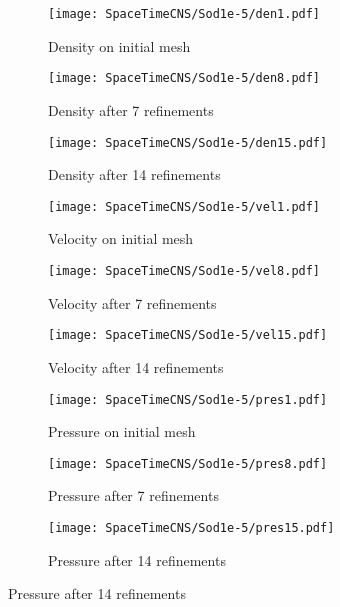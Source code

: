 \documentclass[Proposal.tex]{subfiles}
\begin{document}
\begin{figure}[p]
\centering
\begin{subfigure}[c]{0.3\textwidth}
\centering
\texttt{[image: SpaceTimeCNS/Sod1e-5/den1.pdf]}
\caption{Density on initial mesh}
\label{fig:spaceTimeCNS_den0}
\end{subfigure}
\begin{subfigure}[c]{0.3\textwidth}
\centering
\texttt{[image: SpaceTimeCNS/Sod1e-5/den8.pdf]}
\caption{Density after 7 refinements}
\label{fig:spaceTimeCNS_den7}
\end{subfigure}
\begin{subfigure}[c]{0.3\textwidth}
\centering
\texttt{[image: SpaceTimeCNS/Sod1e-5/den15.pdf]}
\caption{Density after 14 refinements}
\label{fig:spaceTimeCNS_den7}
\end{subfigure}
\begin{subfigure}[c]{0.3\textwidth}
\centering
\texttt{[image: SpaceTimeCNS/Sod1e-5/vel1.pdf]}
\caption{Velocity on initial mesh}
\label{fig:spaceTimeCNS_vel0}
\end{subfigure}
\begin{subfigure}[c]{0.3\textwidth}
\centering
\texttt{[image: SpaceTimeCNS/Sod1e-5/vel8.pdf]}
\caption{Velocity after 7 refinements}
\label{fig:spaceTimeCNS_vel7}
\end{subfigure}
\begin{subfigure}[c]{0.3\textwidth}
\centering
\texttt{[image: SpaceTimeCNS/Sod1e-5/vel15.pdf]}
\caption{Velocity after 14 refinements}
\label{fig:spaceTimeCNS_vel14}
\end{subfigure}
\begin{subfigure}[c]{0.3\textwidth}
\centering
\texttt{[image: SpaceTimeCNS/Sod1e-5/pres1.pdf]}
\caption{Pressure on initial mesh}
\label{fig:spaceTimeCNS_pres0}
\end{subfigure}
\begin{subfigure}[c]{0.3\textwidth}
\centering
\texttt{[image: SpaceTimeCNS/Sod1e-5/pres8.pdf]}
\caption{Pressure after 7 refinements}
\label{fig:spaceTimeCNS_pres7}
\end{subfigure}
\begin{subfigure}[c]{0.3\textwidth}
\centering
\texttt{[image: SpaceTimeCNS/Sod1e-5/pres15.pdf]}
\caption{Pressure after 14 refinements}
\label{fig:spaceTimeCNS_pres14}
\end{subfigure}

\end{figure}
\end{document}
